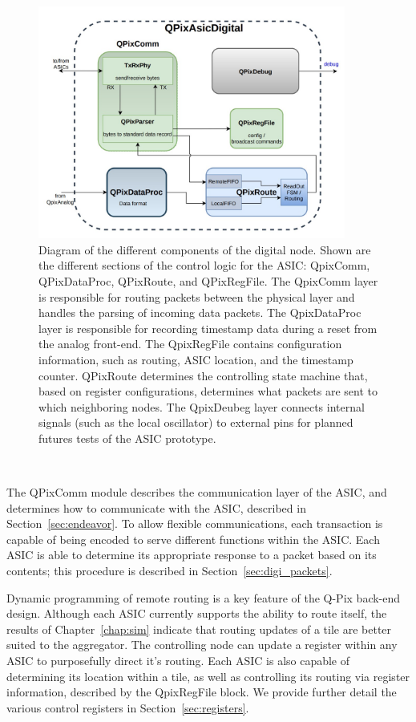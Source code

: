\begin{figure}[]
\centering
\includegraphics[width=0.9\textwidth]{images/digital_node_overview.jpg}
\caption{Diagram of the different components of the digital node.
  Shown are the different sections of the control logic for the ASIC: QpixComm, QPixDataProc, QPixRoute, and QPixRegFile.
  The QpixComm layer is responsible for routing packets between the physical layer and handles the parsing of incoming data packets.
  The QpixDataProc layer is responsible for recording timestamp data during a reset from the analog front-end.
  The QpixRegFile contains configuration information, such as routing, ASIC location, and the timestamp counter.
  QPixRoute determines the controlling state machine that, based on register configurations, determines what packets are sent to which neighboring nodes.
  The QpixDeubeg layer connects internal signals (such as the local oscillator) to external pins for planned futures tests of the ASIC prototype.
  }
\end{figure}~\label{fig:qpa_diagram}

The QPixComm module describes the communication layer of the ASIC, and determines how to communicate with the ASIC, described in Section~\ref{sec:endeavor}.
To allow flexible communications, each transaction is capable of being encoded to serve different functions within the ASIC.
Each ASIC is able to determine its appropriate response to a packet based on its contents; this procedure is described in Section~\ref{sec:digi_packets}.

Dynamic programming of remote routing is a key feature of the Q-Pix back-end design.
Although each ASIC currently supports the ability to route itself, the results of Chapter~\ref{chap:sim} indicate that routing updates of a tile are better suited to the aggregator.
The controlling node can update a register within any ASIC to purposefully direct it's routing.
Each ASIC is also capable of determining its location within a tile, as well as controlling its routing via register information, described by the QpixRegFile block.
We provide further detail the various control registers in Section~\ref{sec:registers}.

